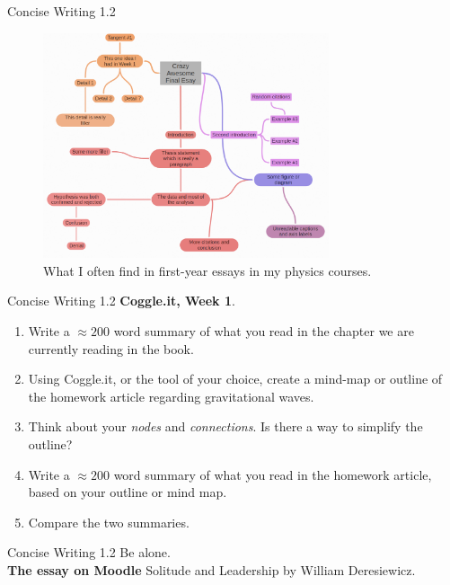 \documentclass{beamer}
\begin{document}
\begin{frame}{Concise Writing 1.2}
\begin{figure}
\centering
\includegraphics[width=0.75\textwidth]{figures/MindMap3.png}
\caption{\label{fig:mm3} What I often find in first-year essays in my physics courses.}
\end{figure}
\end{frame}

\begin{frame}{Concise Writing 1.2}
\textbf{Coggle.it, Week 1}.
\begin{enumerate}
\item Write a $\approx 200$ word summary of what you read in the chapter we are currently reading in the book.
\item Using Coggle.it, or the tool of your choice, create a mind-map or outline of the homework article regarding gravitational waves.
\item Think about your \textit{nodes} and \textit{connections}.  Is there a way to simplify the outline?
\item Write a $\approx 200$ word summary of what you read in the homework article, based on your outline or mind map.
\item Compare the two summaries.
\end{enumerate}
\end{frame}

\begin{frame}{Concise Writing 1.2}
\small
Be alone. \\ \vspace{0.5cm}
\alert{\textbf{The essay on Moodle} Solitude and Leadership} by William Deresiewicz.
\end{frame}
\end{document}
